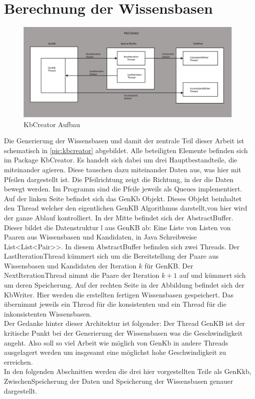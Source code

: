 \documentclass[12pt,a4paper]{article}
\begin{document}
\section{Berechnung der Wissensbasen}
\label{sec:kbcreator} %



\begin{figure}
\includegraphics[width=1\linewidth]{bilder/kbcreator.png}
\caption{KbCreator Aufbau}
\label{pic:kbcreator}
\end{figure}



Die Generierung der Wissensbasen und damit der zentrale Teil dieser Arbeit ist schematisch in \autoref{pic:kbcreator} abgebildet. Alle beteiligten Elemente befinden sich im Package KbCreator. Es handelt sich dabei um drei Hauptbestandteile, die miteinander agieren. Diese tauschen dazu miteinander Daten aus, was hier mit Pfeilen dargestellt ist. Die Pfeilrichtung zeigt die Richtung, in der die Daten bewegt werden. Im Programm sind die Pfeile jeweils als Queues implementiert. Auf der linken  Seite befindet sich das GenKb Objekt. Dieses Objekt beinhaltet den Thread welcher den eigentlichen GenKB Algorithmus darstellt,von hier wird der ganze Ablauf kontrolliert. In der Mitte befindet sich der AbstractBuffer. Dieser bildet die Datenstruktur \glqq l \glqq \space aus GenKB ab: Eine Liste von Listen von Paaren aus Wissensbasen und Kandidaten, in Java Schreibweise List<List<Pair>>. In diesem AbstractBuffer befinden sich zwei Threads. Der LastIterationThread kümmert sich um die Bereitstellung der Paare aus Wissensbasen und Kandidaten der Iteration $k$ für GenKB. Der NextIterationThread nimmt die Paare der Iteration $k+1$ auf und kümmert sich um deren Speicherung. Auf der rechten Seite in der Abbildung befindet sich der KbWriter. Hier werden die erstellten fertigen Wissensbasen gespeichert. Das übernimmt jeweils ein Thread für die konsistenten und ein Thread für die inkonsistenten Wissensbasen. \\
Der Gedanke hinter dieser Architektur ist folgender: Der Thread GenKB ist der kritische Punkt bei der Generierung der Wissensbasen was die Geschwindigkeit angeht. Also soll so viel Arbeit wie möglich von GenKb in andere Threads ausgelagert werden um insgesamt eine möglichst hohe Geschwindigkeit zu erreichen.\\
In den folgenden Abschnitten werden die drei hier vorgestellten Teile als GenKkb, ZwischenSpeicherung der Daten und Speicherung der Wissensbasen genauer dargestellt.
\end{document}
